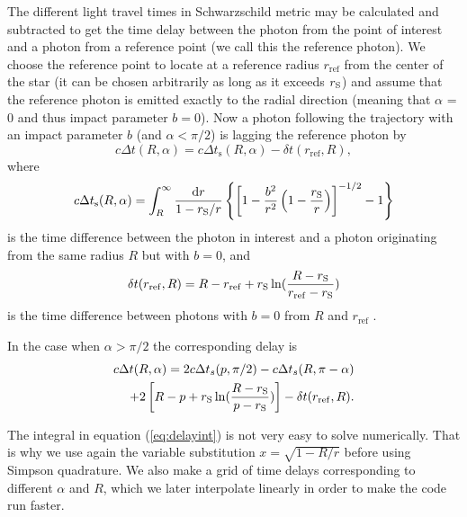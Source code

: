 \documentclass{wihuri}
\def\rg{r_{\rm S}} %
\def\be{\begin{equation}}
\def\ee{\end{equation}}
\def\d{{\rm d}}
\def\rg{r_{\rm S}} %
\begin{document}
The different light travel times in Schwarzschild metric may be calculated and subtracted to get the time delay between the photon from the point of interest and a photon from a reference point (we call this the reference photon). We choose the reference point to locate at a reference radius $r_{\mathrm{ref}}$ from the center of the star (it can be chosen arbitrarily as long as it exceeds $\rg$) and assume that the reference photon is emitted exactly to the radial direction (meaning that $\alpha$ = 0 and thus impact parameter $b = 0$). Now a photon following the trajectory with an impact parameter $b$ (and $\alpha < \pi/2$) is lagging the reference photon by 
\cite{pechenick}
\be \label{eq:delay2}
c\Delta t(R,\alpha)=  c\Delta t_{\mathrm{s}}(R,\alpha) -\delta t(r_{\mathrm{ref}},R),
\ee
where 
\be \label{eq:delayint}
c\Delta t_{\mathrm{s}}(R,\alpha) =
\int_R^{\infty} \frac{\d r}{1- \rg/r}
\left\{ \left[ 1-  \frac{b^2}{r^2}  \left( 1- \frac{\rg}{r} \right)
\right] ^{-1/2}  -1 \right\}
\ee
is the time difference between the photon in interest and a photon originating from the same radius $R$ but with $b=0$, and
\be
\delta t(r_{\mathrm{ref}},R) = R-r_{\mathrm{ref}}+\rg\ln(\frac{R-\rg}{r_{\mathrm{ref}}-\rg})
\ee
is the time difference between photons with $b=0$ from $R$ and $r_{\mathrm{ref}}$ \cite{falkner}. 

In the case when $\alpha > \pi/2$ the corresponding delay is
\be\label{eq:delay22}
\begin{split}
c\Delta t(R,\alpha)= 2c\Delta t_{s}(p,\pi/2)-c\Delta t_{s}(R,\pi-\alpha)\\+2\left[ R-p+\rg\ln(\frac{R-\rg}{p-\rg})\right]-\delta t(r_{\mathrm{ref}},R).
\end{split}
\ee

The integral in equation (\ref{eq:delayint}) is not very easy to solve numerically. That is why we use again the variable substitution $x = \sqrt{1-R/r}$ before using Simpson quadrature. We also make a grid of time delays corresponding to different $\alpha$ and $R$, which we later interpolate linearly in order to make the code run faster.
\end{document}
